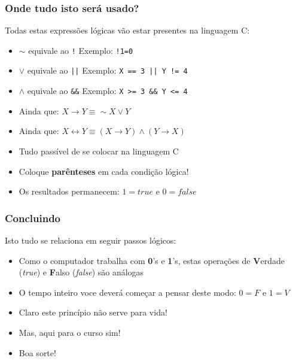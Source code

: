 \documentclass{beamer}
\begin{document}
\begin{frame}
\frametitle{Onde tudo isto será usado?}


\begin{block}{Todas estas expressões lógicas
vão estar presentes na linguagem C: }

\begin{itemize}
    \item $\sim $ equivale ao \texttt{!} \hfill Exemplo: \texttt{!1=0}
    \item $ \vee $ equivale ao \texttt{||} \hfill Exemplo: \texttt{X == 3 || Y != 4}
    \item $ \wedge $ equivale ao \texttt{\&\&} \hfill Exemplo: \texttt{X >= 3 \&\& Y <= 4}
    \pause
    
    \item Ainda que: $ X \rightarrow Y \equiv \sim X \vee Y$ 
    \pause

        \item Ainda que: $ X \leftrightarrow Y \equiv (X \rightarrow Y) \wedge (Y \rightarrow X)$ 
      \pause  
        
    \item Tudo passível de se colocar na linguagem C    
    \item Coloque \textbf{parênteses} em cada condição lógica!
    \item Os resultados permanecem: $1 = true$  e $0 = false$

\end{itemize}

  \end{block}


\end{frame}





\begin{frame}
\frametitle{Concluindo}


\begin{block}{Isto tudo se relaciona em seguir passos lógicos: }

\begin{itemize}

  \item Como o computador trabalha com \textbf{0}'s e \textbf{1}'s, estas operações de \textbf{V}erdade (\textit{true}) e \textbf{F}also (\textit{false}) são análogas
  \pause
    
    \item O tempo inteiro voce deverá começar a pensar deste modo: $0 = F $ e $1 = V$
    
      \pause
    \item Claro este princípio não serve para vida!
      \pause
    \item Mas, aqui para o curso sim!
      \pause
    \item Boa sorte!

\end{itemize}

  \end{block}



\end{frame}
\end{document}
